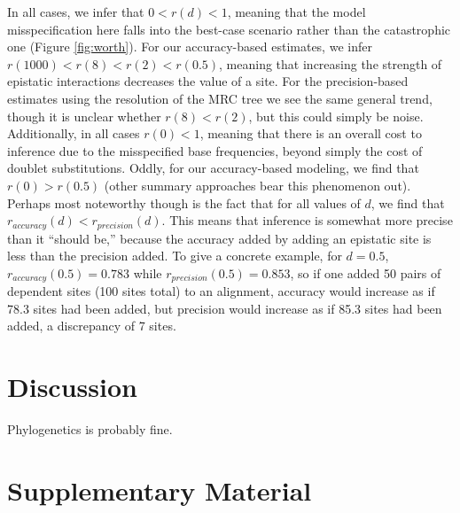 \documentclass[11pt]{article}
\begin{document}
In all cases, we infer that $0 < r(d) < 1$, meaning that the model misspecification here falls into the best-case scenario rather than the catastrophic one (Figure \ref{fig:worth}).
For our accuracy-based estimates, we infer $r(1000) < r(8) < r(2) < r(0.5)$, meaning that increasing the strength of epistatic interactions decreases the value of a site.
For the precision-based estimates using the resolution of the MRC tree we see the same general trend, though it is unclear whether $r(8) < r(2)$, but this could simply be noise.
Additionally, in all cases $r(0) < 1$, meaning that there is an overall cost to inference due to the misspecified base frequencies, beyond simply the cost of doublet substitutions.
Oddly, for our accuracy-based modeling, we find that $r(0) > r(0.5)$ (other summary approaches bear this phenomenon out).
Perhaps most noteworthy though is the fact that for all values of $d$, we find that $r_{accuracy}(d) < r_{precision}(d)$.
This means that inference is somewhat more precise than it ``should be,'' because the accuracy added by adding an epistatic site is less than the precision added.
To give a concrete example, for $d = 0.5$, $r_{accuracy}(0.5) = 0.783$ while $r_{precision}(0.5) = 0.853$, so if one added 50 pairs of dependent sites (100 sites total) to an alignment, accuracy would increase as if 78.3 sites had been added, but precision would increase as if 85.3 sites had been added, a discrepancy of 7 sites.

\section*{Discussion\label{sec:discussion}}

Phylogenetics is probably fine.

\section*{Supplementary Material}
\end{document}
